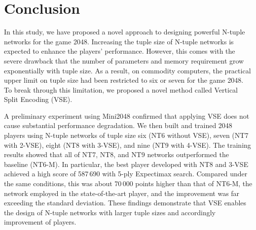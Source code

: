 \section{Conclusion}
In this study, we have proposed a novel approach to designing powerful N-tuple networks for the game 2048.
Increasing the tuple size of N-tuple networks is expected to enhance the players' performance.
However, this comes with the severe drawback that the number of parameters and memory requirement grow exponentially with tuple size.  As a result, on commodity computers, the practical upper limit on tuple size had been restricted to six or seven for the game 2048.
To break through this limitation, we proposed a novel method called Vertical Split Encoding (VSE).


A preliminary experiment using Mini2048 confirmed that applying VSE does not cause substantial performance degradation.
We then built and trained 2048 players using N-tuple networks of tuple size six (\textsf{NT6} without VSE), seven (\textsf{NT7} with 2-VSE), eight (\textsf{NT8} with 3-VSE), and nine (\textsf{NT9} with 4-VSE).
The training results showed that all of \textsf{NT7}, \textsf{NT8}, and \textsf{NT9} networks outperformed the baseline (\textsf{NT6-M}).
In particular, the best player developed with \textsf{NT8} and 3-VSE achieved a high score of 587\,690 with 5-ply Expectimax search. Compared under the same conditions, this was about 70\,000 points higher than that of \textsf{NT6-M}, the network employed in the state-of-the-art player, and the improvement was far exceeding the standard deviation.
These findings demonstrate that VSE enables the design of N-tuple networks with larger tuple sizes and accordingly improvement of players.

